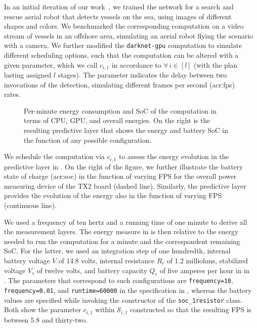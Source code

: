 In an initial iteration of our work~\citep{teamplayd43}, we trained the network for a search and rescue aerial robot that detects vessels on the sea, using images of different shapes and colors. We benchmarked the corresponding computation on a video stream of vessels in an offshore area, simulating an aerial robot flying the scenario with a camera. We further modified the {\small\tt darknet-gpu} computation to simulate different scheduling options, such that the computation can be altered with a given parameter, which we call $c_{i,1}$ in accordance to  $\forall\,i\in[l]$  (with the plan lasting assigned $l$ stages). The parameter indicates the delay between two invocations of the detection, simulating different frames per second (\Gls{acr:fps}) rates. 
\begin{figure}[h!]
  \centering
  \selectfont
  
  \caption[Per-minute energy consumption and SoC of the  computation]{Per-minute energy consumption and SoC of the  computation in terms of CPU, GPU, and overall energies. On the right is the resulting predictive layer that shows the energy and battery SoC in the function of any possible configuration.}
  \label{fig:darknet-layer2}
\end{figure}
We schedule the computation via $c_{i,1}$ to assess the energy evolution in the predictive layer in . On the right of the figure, we further illustrate the battery state of charge (\Gls{acr:soc}) in the function of varying FPS for the overall power measuring device of the TX2 board (dashed line). Similarly, the predictive layer provides the evolution of the energy also in the function of varying FPS (continuous line).

We used a frequency of ten hertz and a running time of one minute to derive all the measurement layers. The energy measure in  is then relative to the energy needed to run the computation for a minute and the correspondent remaining SoC. For the latter, we used an integration step of one hundredth, internal battery voltage $V$ of 14.8 volts, internal resistance $R_r$ of 1.2 milliohms, stabilized voltage $V_s$ of twelve volts, and battery capacity $Q_c$ of five amperes per hour in  in . The parameters that correspond to such configurations are {\small\tt frequency=10}, {\small\tt frequency=0.01}, and {\small\tt runtime=60000} in the specification in , whereas the battery values are specified while invoking the constructor of the {\small\tt soc\_1resistor} class. Both  show the parameter $c_{i,1}$ within $\mathcal{S}_{i,1}$ constructed so that the resulting FPS is between 5.8 and thirty-two.

